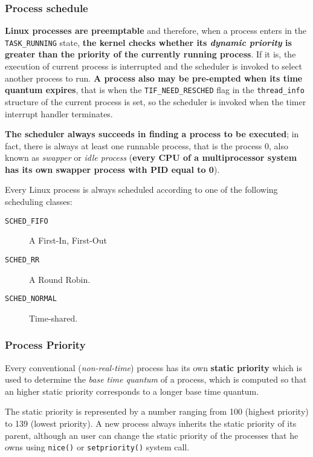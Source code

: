 \documentclass[10pt,a4paper]{article}
\begin{document}
\subsubsection{Process schedule}

\textbf{Linux processes are preemptable} and therefore, when a process enters in the \texttt{TASK\_RUNNING} state, \textbf{the kernel checks whether its \textit{dynamic priority} is greater than the priority of the currently running process}. If it is, the execution of current process is interrupted and the scheduler is invoked to select another process to run. \textbf{A process also may be pre-empted when its time quantum expires}, that is when the \texttt{TIF\_NEED\_RESCHED} flag in the \texttt{thread\_info} structure of the current process is set, so the scheduler is invoked when the timer interrupt handler terminates.

\textbf{The scheduler always succeeds in finding a process to be executed}; in fact, there is always at least one runnable process, that is the process 0, also known as \textit{swapper} or \textit{idle process} (\textbf{every CPU of a multiprocessor system has its own swapper process with PID equal to 0}).

Every Linux process is always scheduled according to one of the following scheduling classes:

\begin{description}
\item[\texttt{SCHED\_FIFO}] A First-In, First-Out
\item[\texttt{SCHED\_RR}] A Round Robin.
\item[\texttt{SCHED\_NORMAL}] Time-shared.
\end{description}

\subsubsection{Process Priority}

Every conventional (\textit{non-real-time}) process has its own \textbf{static priority} which is used to determine the \textit{base time quantum} of a process, which is computed so that an higher static priority corresponds to a longer base time quantum.

The static priority is represented by a number ranging from 100 (highest priority) to 139 (lowest priority). A new process always inherits the static priority of its parent, although an user can change the static priority of the processes that he owns using \texttt{nice()} or \texttt{setpriority()} system call.
\end{document}
